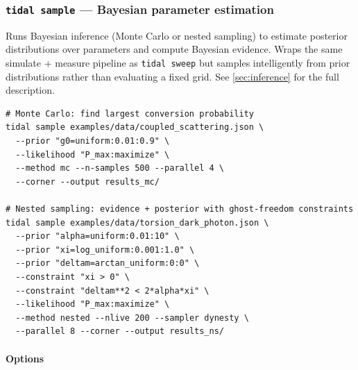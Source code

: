\subsubsection{\texttt{tidal sample} --- Bayesian parameter estimation}

Runs Bayesian inference (Monte Carlo or nested sampling) to estimate posterior
distributions over parameters and compute Bayesian evidence.  Wraps the same
simulate + measure pipeline as \texttt{tidal sweep} but samples intelligently
from prior distributions rather than evaluating a fixed grid.  See
\cref{sec:inference} for the full description.

\begin{lstlisting}[style=bash]
# Monte Carlo: find largest conversion probability
tidal sample examples/data/coupled_scattering.json \
  --prior "g0=uniform:0.01:0.9" \
  --likelihood "P_max:maximize" \
  --method mc --n-samples 500 --parallel 4 \
  --corner --output results_mc/

# Nested sampling: evidence + posterior with ghost-freedom constraints
tidal sample examples/data/torsion_dark_photon.json \
  --prior "alpha=uniform:0.01:10" \
  --prior "xi=log_uniform:0.001:1.0" \
  --prior "deltam=arctan_uniform:0:0" \
  --constraint "xi > 0" \
  --constraint "deltam**2 < 2*alpha*xi" \
  --likelihood "P_max:maximize" \
  --method nested --nlive 200 --sampler dynesty \
  --parallel 8 --corner --output results_ns/
\end{lstlisting}

\paragraph{Options}

